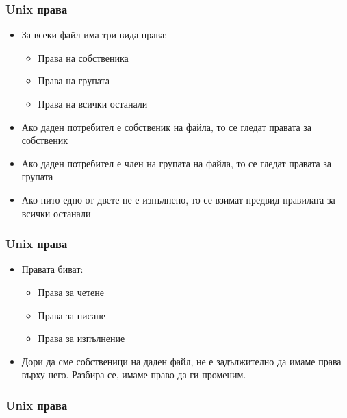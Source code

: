 \documentclass[ignorenonframetext, hyperref=unicode]{beamer}
\begin{document}
\begin{frame}
\frametitle{Unix права}
\begin{itemize}
  \item За всеки файл има три вида права:
  \begin{itemize}
	\item Права на собственика
	\item Права на групата
	\item Права на всички останали
  \end{itemize}
  \item Ако даден потребител е собственик на файла, то се гледат правата за собственик
  \item Ако даден потребител е член на групата на файла, то се гледат правата за групата
  \item Ако нито едно от двете не е изпълнено, то се взимат предвид правилата за всички останали
\end{itemize}
\end{frame}


\begin{frame}
\frametitle{Unix права}
\begin{itemize}
  \item Правата биват:
  \begin{itemize}
	\item Права за четене
	\item Права за писане
	\item Права за изпълнение
  \end{itemize}
  \item Дори да сме собственици на даден файл, не е задължително да имаме права върху него. Разбира се, имаме право да ги променим.
\end{itemize}
\end{frame}

\begin{frame}
\frametitle{Unix права}
\begin{figure}[h]
\center
{}
\end{figure}
\end{frame}
\end{document}
